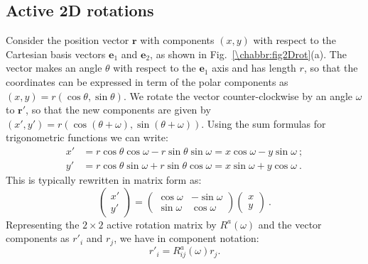 \subsection{Active 2D rotations}\label{\chabbr:ssec:2Dactive}
Consider the position vector $\mathbf{r}$ with components $(x,y)$ with respect to the Cartesian basis vectors $\mathbf{e}_1$ and $\mathbf{e}_2$, as shown in Fig.~\ref{\chabbr:fig2Drot}(a).  The vector makes an angle $\theta$ with respect to the $\mathbf{e}_1$ axis and has length $r$, so that the coordinates can be expressed in term of the polar components as $(x,y) = r(\cos\theta,\sin\theta)$.  We rotate the vector counter-clockwise by an angle $\omega$ to $\mathbf{r}'$, so that the new components are given by $(x',y') = r\left(\cos(\theta+\omega),\sin(\theta+\omega)\right)$.  Using the sum formulas for trigonometric functions we can write:
\begin{align*}
	x' &= r\cos\theta\cos\omega - r\sin\theta\sin\omega = x\cos\omega - y\sin\omega\ ;\\
	y' &= r\cos\theta\sin\omega + r\sin\theta\cos\omega = x\sin\omega + y\cos\omega\ .	
\end{align*}
This is typically rewritten in matrix form as:
\[
	\left(\begin{array}{c} x' \\ y'\end{array}\right) = 
	\left(\begin{array}{cc} \cos\omega & -\sin\omega\\ \sin\omega & \cos\omega\end{array}\right)
	\left(\begin{array}{c} x \\ y\end{array}\right) \ .	
\]
Representing the $2\times 2$ active rotation matrix by $R^a(\omega)$ and the vector components as $r'_i$ and $r_j$, we have in component notation:
\begin{equation}
	r'_i = R^a_{ij}(\omega) r_j.
\end{equation}


